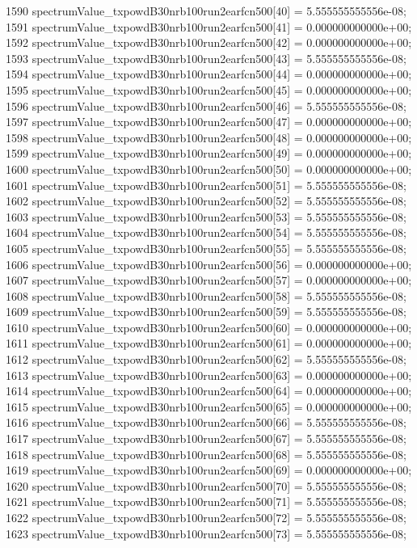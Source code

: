 \begin{DoxyCode}
1590   spectrumValue\_txpowdB30nrb100run2earfcn500[40] = 5.555555555556e-08;
1591   spectrumValue\_txpowdB30nrb100run2earfcn500[41] = 0.000000000000e+00;
1592   spectrumValue\_txpowdB30nrb100run2earfcn500[42] = 0.000000000000e+00;
1593   spectrumValue\_txpowdB30nrb100run2earfcn500[43] = 5.555555555556e-08;
1594   spectrumValue\_txpowdB30nrb100run2earfcn500[44] = 0.000000000000e+00;
1595   spectrumValue\_txpowdB30nrb100run2earfcn500[45] = 0.000000000000e+00;
1596   spectrumValue\_txpowdB30nrb100run2earfcn500[46] = 5.555555555556e-08;
1597   spectrumValue\_txpowdB30nrb100run2earfcn500[47] = 0.000000000000e+00;
1598   spectrumValue\_txpowdB30nrb100run2earfcn500[48] = 0.000000000000e+00;
1599   spectrumValue\_txpowdB30nrb100run2earfcn500[49] = 0.000000000000e+00;
1600   spectrumValue\_txpowdB30nrb100run2earfcn500[50] = 0.000000000000e+00;
1601   spectrumValue\_txpowdB30nrb100run2earfcn500[51] = 5.555555555556e-08;
1602   spectrumValue\_txpowdB30nrb100run2earfcn500[52] = 5.555555555556e-08;
1603   spectrumValue\_txpowdB30nrb100run2earfcn500[53] = 5.555555555556e-08;
1604   spectrumValue\_txpowdB30nrb100run2earfcn500[54] = 5.555555555556e-08;
1605   spectrumValue\_txpowdB30nrb100run2earfcn500[55] = 5.555555555556e-08;
1606   spectrumValue\_txpowdB30nrb100run2earfcn500[56] = 0.000000000000e+00;
1607   spectrumValue\_txpowdB30nrb100run2earfcn500[57] = 0.000000000000e+00;
1608   spectrumValue\_txpowdB30nrb100run2earfcn500[58] = 5.555555555556e-08;
1609   spectrumValue\_txpowdB30nrb100run2earfcn500[59] = 5.555555555556e-08;
1610   spectrumValue\_txpowdB30nrb100run2earfcn500[60] = 0.000000000000e+00;
1611   spectrumValue\_txpowdB30nrb100run2earfcn500[61] = 0.000000000000e+00;
1612   spectrumValue\_txpowdB30nrb100run2earfcn500[62] = 5.555555555556e-08;
1613   spectrumValue\_txpowdB30nrb100run2earfcn500[63] = 0.000000000000e+00;
1614   spectrumValue\_txpowdB30nrb100run2earfcn500[64] = 0.000000000000e+00;
1615   spectrumValue\_txpowdB30nrb100run2earfcn500[65] = 0.000000000000e+00;
1616   spectrumValue\_txpowdB30nrb100run2earfcn500[66] = 5.555555555556e-08;
1617   spectrumValue\_txpowdB30nrb100run2earfcn500[67] = 5.555555555556e-08;
1618   spectrumValue\_txpowdB30nrb100run2earfcn500[68] = 5.555555555556e-08;
1619   spectrumValue\_txpowdB30nrb100run2earfcn500[69] = 0.000000000000e+00;
1620   spectrumValue\_txpowdB30nrb100run2earfcn500[70] = 5.555555555556e-08;
1621   spectrumValue\_txpowdB30nrb100run2earfcn500[71] = 5.555555555556e-08;
1622   spectrumValue\_txpowdB30nrb100run2earfcn500[72] = 5.555555555556e-08;
1623   spectrumValue\_txpowdB30nrb100run2earfcn500[73] = 5.555555555556e-08;

\end{DoxyCode}
